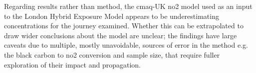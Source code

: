 Regarding results rather than method, the \gls{cmaq}-UK \gls{no2} model used as an input to the London Hybrid Exposure Model appears to be underestimating concentrations for the journey examined. Whether this can be extrapolated to draw wider conclusions about the model are unclear; the findings have large caveats due to multiple, mostly unavoidable, sources of error in the method e.g. the black carbon to \gls{no2} conversion and sample size, that require fuller exploration of their impact and propagation.


